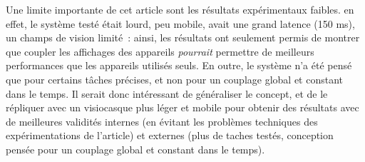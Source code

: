Une limite importante de cet article sont les résultats expérimentaux faibles. en effet, le système testé était lourd, peu mobile, avait une grand latence (150 ms), un champs de vision limité~: ainsi, les résultats ont seulement permis de montrer que coupler les affichages des appareils \emph{pourrait} permettre de meilleurs performances que les appareils utilisés seuls. En outre, le système n'a été pensé que pour certains tâches précises, et non pour un couplage global et constant dans le temps. Il serait donc intéressant de généraliser le concept, et de le répliquer avec un visiocasque plus léger et mobile pour obtenir des résultats avec de meilleures validités internes (en évitant les problèmes techniques des expérimentations de l'article) et externes (plus de taches testés, conception pensée pour un couplage global et constant dans le temps).


\paragraph*{}


\paragraph*{}








